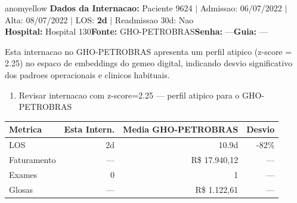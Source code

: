 \documentclass[a4paper,10pt]{article}
\begin{document}
\begin{anomalycard}[Internacao 9893 | GHO-PETROBRAS | MODERADO (z=2.25)]{anomyellow}
\textbf{Dados da Internacao:} Paciente 9624 $\mid$ Admissao: 06/07/2022 $\mid$ Alta: 08/07/2022 $\mid$ LOS: \textbf{2d} $\mid$ Readmissao 30d: Nao\\
\textbf{Hospital:} Hospital 130\quad\textbf{Fonte:} GHO-PETROBRAS\quad\textbf{Senha:} ---\quad\textbf{Guia:} ---\\
\vspace{2pt}\begin{tcolorbox}[colback=severityred!20,colframe=anomyellow,title={\textbf{Interpretacao de Negocio}},fonttitle=\bfseries\small,left=4pt,right=4pt,top=3pt,bottom=3pt]
{\small Esta internacao no GHO-PETROBRAS apresenta um perfil atipico (z-score = 2.25) no espaco de embeddings do gemeo digital, indicando desvio significativo dos padroes operacionais e clinicos habituais.}
\end{tcolorbox}
\begin{tcolorbox}[colback=severityyellow!30,colframe=anomorange,title={\textbf{Recomendacoes Especificas}},fonttitle=\bfseries\small,left=4pt,right=4pt,top=3pt,bottom=3pt]
\begin{enumerate}[nosep,leftmargin=16pt]
\item {\small Revisar internacao com z-score=2.25 --- perfil atipico para o GHO-PETROBRAS}
\end{enumerate}
\end{tcolorbox}
\begin{center}\begin{tabular}{l r r r}\toprule\textbf{Metrica} & \textbf{Esta Intern.} & \textbf{Media GHO-PETROBRAS} & \textbf{Desvio} \\\midrule
LOS & 2d & 10.9d & -82\% \\
Faturamento & --- & R\$ 17.940,12 & --- \\
Exames & 0 & 1 & --- \\
Glosas & --- & R\$ 1.122,61 & --- \\
\bottomrule\end{tabular}\end{center}


\end{anomalycard}
\end{document}
